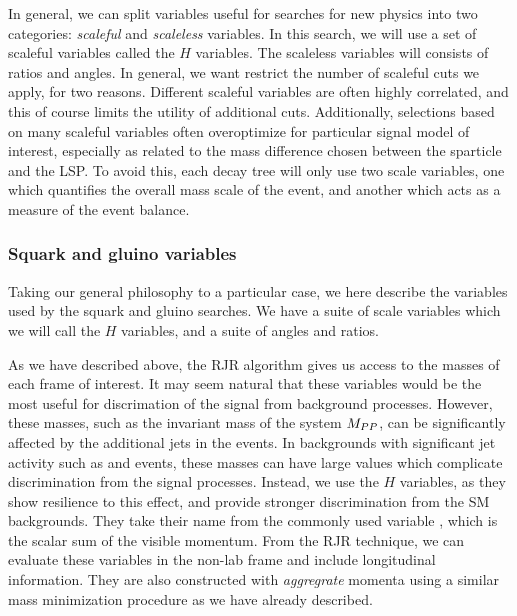 In general, we can split variables useful for searches for new physics into two categories: \textit{scaleful} and \textit{scaleless} variables.
In this search, we will use a set of scaleful variables called the $H$ variables.
The scaleless variables will consists of ratios and angles.
In general, we want restrict the number of scaleful cuts we apply, for two reasons.
Different scaleful variables are often highly correlated, and this of course limits the utility of additional cuts.
Additionally, selections based on many scaleful variables often overoptimize for particular signal model of interest, especially as related to the mass difference chosen between the sparticle and the LSP.
To avoid this, each decay tree will only use two scale variables, one which quantifies the overall mass scale of the event, and another which acts as a measure of the event balance.

\subsubsection{Squark and gluino variables}

Taking our general philosophy to a particular case, we here describe the variables used by the squark and gluino searches.
We have a suite of scale variables which we will call the $H$ variables, and a suite of angles and ratios.

As we have described above, the RJR algorithm gives us access to the masses of each frame of interest.
It may seem natural that these variables would be the most useful for discrimation of the signal from background processes.
However, these masses, such as the invariant mass of the \PP system $M_{PP }$, can be significantly affected by the additional jets in the events.
In backgrounds with significant jet activity such as \zjets and \wjets events, these masses can have large values which complicate discrimination from the signal processes.
Instead, we use the $H$ variables, as they show resilience to this effect, and provide stronger discrimination from the SM backgrounds.
They take their name from the commonly used variable \HT, which is the scalar sum of the visible momentum.
From the RJR technique, we can evaluate these variables in the non-lab frame and include longitudinal information.
They are also constructed with \textit{aggregrate} momenta using a similar mass minimization procedure as we have already described.

